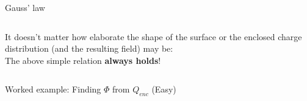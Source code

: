 \begin{frame}{Gauss' law}
\begin{columns}
\begin{column}{0.67\textwidth}
      It doesn't matter how elaborate the shape of the surface or the enclosed
      charge distribution (and the resulting field) may be:\\
      The above simple relation {\bf always holds}!\\
  \end{column}
\end{columns}
\end{frame}

%
%

{
\problemslide

%
%
%

\begin{frame}{Worked example: Finding $\Phi$ from $Q_{enc}$ (Easy)}


\end{frame}}
